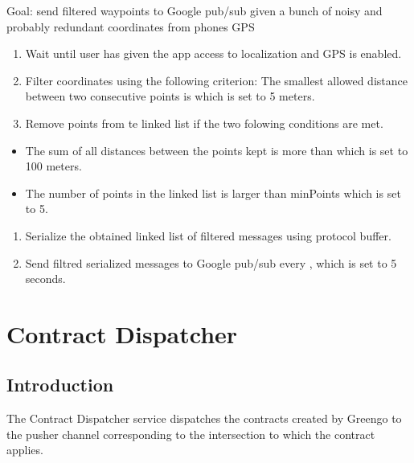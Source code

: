 \documentclass[letterpaper,10pt,english]{sphinxmanual}
\begin{document}
Goal: send filtered waypoints to Google pub/sub given a bunch of noisy and probably redundant coordinates from phones GPS
\begin{enumerate}
\def\theenumi{\arabic{enumi}}
\def\labelenumi{\theenumi .}
\makeatletter\def\p@enumii{\p@enumi \theenumi .}\makeatother
\item {} 
Wait until user has given the app access to localization and GPS is enabled.

\item {} 
Filter coordinates using the following criterion: The smallest allowed distance between two consecutive points is  which is set to 5 meters.

\item {} 
Remove points from te linked list if the two folowing conditions are met.

\end{enumerate}
\begin{itemize}
\item {} 
The sum of all distances between the points kept is more than  which is set to 100 meters.

\item {} 
The number of points in the linked list is larger than minPoints which is set to 5.

\end{itemize}
\begin{enumerate}
\def\theenumi{\arabic{enumi}}
\def\labelenumi{\theenumi .}
\makeatletter\def\p@enumii{\p@enumi \theenumi .}\makeatother
\setcounter{enumi}{3}
\item {} 
Serialize the obtained linked list of filtered messages using protocol buffer.

\item {} 
Send filtred serialized messages to Google pub/sub every , which is set to 5 seconds.

\end{enumerate}


\section{Contract Dispatcher}
\label{\detokenize{microservices/contract_dispatcher/index:contract-dispatcher}}\label{\detokenize{microservices/contract_dispatcher/index::doc}}

\subsection{Introduction}
\label{\detokenize{microservices/contract_dispatcher/introduction:introduction}}\label{\detokenize{microservices/contract_dispatcher/introduction::doc}}
The Contract Dispatcher service dispatches the contracts created by Greengo to the pusher channel corresponding to the intersection to which the contract applies.
\end{document}
